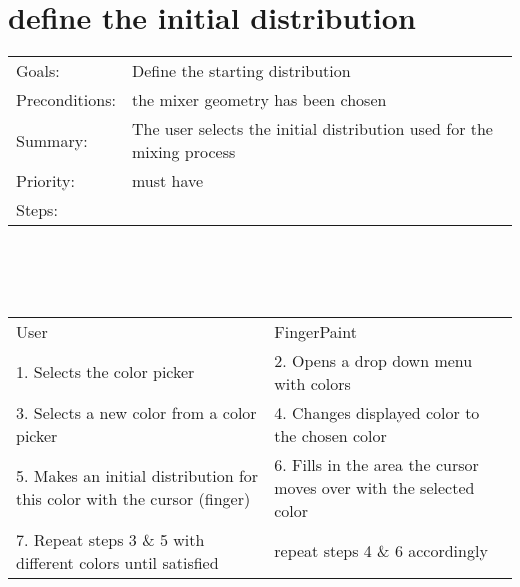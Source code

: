 \documentclass[a4paper,twoside,11pt]{article}
\begin{document}
\section*{define the initial distribution}
\begin{tabular}{ll}

 Goals: & Define the starting distribution \\
 Preconditions: & the mixer geometry has been chosen \\
 Summary: & The user selects the initial distribution used for the mixing process \\
 Priority: & must have \\
 Steps: & \\
\end{tabular} \\
\ \\ \ \\
\begin{tabular}{p{}p{}}
 User                       & FingerPaint                            \\
 1. Selects the color picker & 2. Opens a drop down menu with colors \\
 3. Selects a new color from a color picker & 4. Changes displayed color to the chosen color \\
 5. Makes an initial distribution for this color with the cursor (finger)  & 6. Fills in the area the cursor moves over with the selected color \\
 7. Repeat steps 3 \& 5 with different colors until satisfied & repeat steps 4 \& 6 accordingly \\
\end{tabular}
\end{document}
